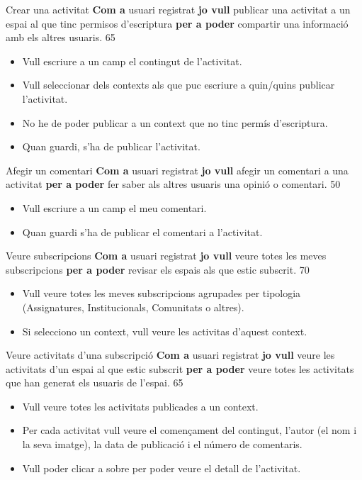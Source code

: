 \pintaHistoria
    {Crear una activitat}
    {\textbf{Com a} usuari registrat \textbf{jo vull} publicar una activitat a un espai al que tinc permisos d'escriptura \textbf{per a poder} compartir una informació amb els altres usuaris.}
    {65}
    {
    \begin{itemize}[leftmargin=0.3cm]
        \item Vull escriure a un camp el contingut de l'activitat.
        \item Vull seleccionar dels contexts als que puc escriure a quin/quins publicar l'activitat.
        \item No he de poder publicar a un context que no tinc permís d'escriptura.
        \item Quan guardi, s'ha de publicar l'activitat. 
    \end{itemize}
    }
    
\pintaHistoria
    {Afegir un comentari}
    {\textbf{Com a} usuari registrat \textbf{jo vull} afegir un comentari a una activitat \textbf{per a poder} fer saber als altres usuaris una opinió o comentari.}
    {50}
    {
    \begin{itemize}[leftmargin=0.3cm]
        \item Vull escriure a un camp el meu comentari.
        \item Quan guardi s'ha de publicar el comentari a l'activitat.
    \end{itemize}
    }

\pintaHistoria
    {Veure subscripcions}
    {\textbf{Com a} usuari registrat \textbf{jo vull} veure totes les meves subscripcions \textbf{per a poder} revisar els espais als que estic subscrit.}
    {70}
    {
    \begin{itemize}[leftmargin=0.3cm]
        \item Vull veure totes les meves subscripcions agrupades per tipologia (Assignatures, Institucionals, Comunitats o altres).
        \item Si selecciono un context, vull veure les activitas d'aquest context.
    \end{itemize}
    }
    
\pintaHistoria
    {Veure activitats d'una subscripció}
    {\textbf{Com a} usuari registrat \textbf{jo vull} veure les activitats d'un espai al que estic subscrit \textbf{per a poder} veure totes les activitats que han generat els usuaris de l'espai.}
    {65}
    {
    \begin{itemize}[leftmargin=0.3cm]
        \item Vull veure totes les activitats publicades a un context.
        \item Per cada activitat vull veure el començament del contingut, l'autor (el nom i la seva imatge), la data de publicació i el número de comentaris.
        \item Vull poder clicar a sobre per poder veure el detall de l'activitat.
    \end{itemize}
    }

